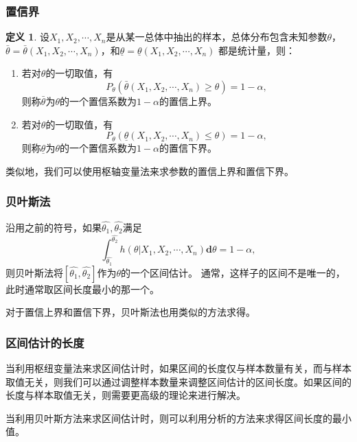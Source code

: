 \documentclass[a4paper,11pt]{article}%
\theoremstyle{remark}
\theoremstyle{remark}
\theoremstyle{definition}
\theoremstyle{definition}
\newtheorem*{definition}{定义}
\theoremstyle{plain}
\begin{document}
\subsubsection{置信界}
\begin{definition}
    设$X_1,X_2,\cdots,X_n$是从某一总体中抽出的样本，总体分布包含未知参数$\theta$，$\bar{\theta}=\bar{\theta}(X_1,X_2,\cdots,X_n)$，和$\underline{\theta}=\underline{\theta}(X_1,X_2,\cdots,X_n)$
    都是统计量，则：
    \begin{enumerate}
        \item 若对$\theta$的一切取值，有 
    \[P_{\theta}(\bar{\theta}   (X_1,X_2,\cdots,X_n)\geq\theta)=1-\alpha,\]
    则称$\bar{\theta}$为$\theta$的一个置信系数为$1-\alpha$的置信上界。
         \item 若对$\theta$的一切取值，有 
    \[P_{\theta}(\underline{\theta}(X_1,X_2,\cdots,X_n)\leq\theta)=1-\alpha,\]
    则称$\underline{\theta}$为$\theta$的一个置信系数为$1-\alpha$的置信下界。
    \end{enumerate}
\end{definition}
类似地，我们可以使用枢轴变量法来求参数的置信上界和置信下界。
\subsubsection{贝叶斯法}
沿用之前的符号，如果$\hat{\theta_1},\hat{\theta_2}$满足 
\[\int_{\hat{\theta_1}}^{\hat{\theta_2}}h(\theta|X_1,X_2,\cdots,X_n)\mathbf{d}\theta=1-\alpha,\]
则贝叶斯法将$[\hat{\theta_1},\hat{\theta_2}]$作为$\theta$的一个区间估计。
通常，这样子的区间不是唯一的，此时通常取区间长度最小的那一个。

对于置信上界和置信下界，贝叶斯法也用类似的方法求得。
\subsubsection{区间估计的长度}
当利用枢纽变量法来求区间估计时，如果区间的长度仅与样本数量有关，而与样本取值无关，则我们可以通过调整样本数量来调整区间估计的区间长度。如果区间的长度与样本取值无关，则需要更高级的理论来进行解决。

当利用贝叶斯方法来求区间估计时，则可以利用分析的方法来求得区间长度的最小值。
\end{document}
